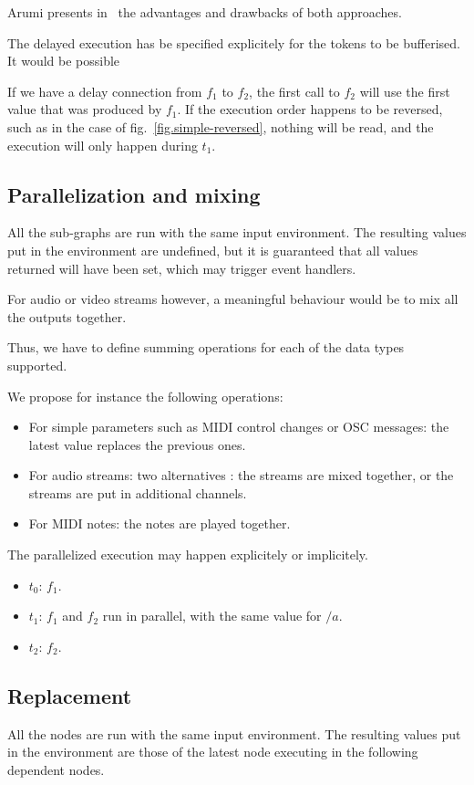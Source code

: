 \documentclass{article}
\begin{document}
Arumi presents in~\cite{arumi2006dataflow} the advantages and drawbacks of both approaches.
	
    
The delayed execution has be specified explicitely for the tokens to be bufferised.
It would be possible
    
If we have a delay connection from $f_1$ to $f_2$, the first call to $f_2$ will use the first value that was produced by $f_1$.
If the execution order happens to be reversed, such as in the case of fig.~\ref{fig.simple-reversed}, nothing will be read, and the execution will only happen during $t_1$.
	
\subsection{Parallelization and mixing}
All the sub-graphs are run with the same input environment. 
The resulting values put in the environment are undefined, but it is guaranteed that all values returned will have been set, which may trigger event handlers.
    
For audio or video streams however, a meaningful behaviour would be to mix all the outputs together.
    
Thus, we have to define summing operations for each of the data types supported.
    
We propose for instance the following operations: 
\begin{itemize}
  \item For simple parameters such as MIDI control changes or OSC messages: the latest value replaces the previous ones.
  \item For audio streams: two alternatives : the streams are mixed together, or the streams are put in additional channels.
  \item For MIDI notes: the notes are played together.
\end{itemize}

The parallelized execution may happen explicitely or implicitely.

\begin{itemize}
  \item $t_0$: $f_1$.
  \item $t_1$: $f_1$ and $f_2$ run in parallel, with the same value for $/a$.
  \item $t_2$: $f_2$. 
\end{itemize}
     
\subsection{Replacement}
All the nodes are run with the same input environment. 
The resulting values put in the environment are those of the latest node executing in the following dependent nodes.
    
\end{document}
